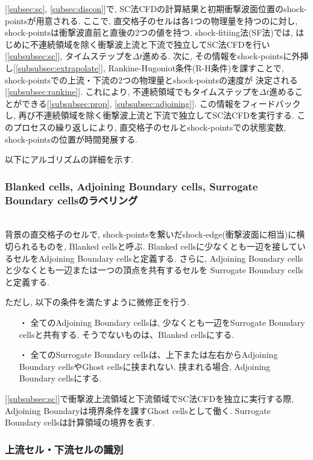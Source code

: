 \documentclass[a4j]{jarticle}
\begin{document}
[\ref{subsec:sc}, \ref{subsec:discon}]で, SC法CFDの計算結果と初期衝撃波面位置のshock-pointsが用意される.
ここで, 直交格子のセルは各1つの物理量を持つのに対し, shock-pointsは衝撃波直前と直後の2つの値を持つ.
shock-fitiing法(SF法)では, はじめに不連続領域を除く衝撃波上流と下流で独立してSC法CFDを行い[\ref{subsubsec:sc}], タイムステップを$\Delta t$進める.
次に, その情報をshock-pointsに外挿し[\ref{subsubsec:extrapolate}], Rankine-Hugoniot条件(R-H条件)を課すことで, shock-pointsでの上流・下流の2つの物理量とshock-pointsの速度が
決定される[\ref{subsubsec:rankine}]. これにより, 不連続領域でもタイムステップを$\Delta t$進めることができる[\ref{subsubsec:prop}, \ref{subsubsec:adjoining}]. この情報をフィードバックし, 再び不連続領域を除く衝撃波上流と下流で独立してSC法CFDを実行する.
このプロセスの繰り返しにより, 直交格子のセルとshock-pointsでの状態変数, shock-pointsの位置が時間発展する. 

以下にアルゴリズムの詳細を示す.

\subsubsection{Blanked cells, Adjoining Boundary cells, Surrogate Boundary cellsのラベリング} \label{subsubsec:boundary}
\mbox{}\\[1.0ex]
背景の直交格子のセルで, shock-pointsを繋いだshock-edge(衝撃波面に相当)に横切られるものを,
Blanked cellsと呼ぶ. 
Blanked cellsに少なくとも一辺を接しているセルをAdjoining Boundary cellsと定義する.
さらに, Adjoining Boundary cellsと少なくとも一辺または一つの頂点を共有するセルを
Surrogate Boundary cellsと定義する.

ただし, 以下の条件を満たすように微修正を行う.
\begin{itemize}
  \item[・]  全てのAdjoining Boundary cellsは, 少なくとも一辺をSurrogate Boundary cellsと共有する.
  そうでないものは、Blanked cellsにする.
  \item[・]  全てのSurrogate Boundary cellsは、上下または左右からAdjoining Boundary cellsやGhost cellsに挟まれない.
  挟まれる場合, Adjoining Boundary cellsにする.
\end{itemize}

[\ref{subsubsec:sc}]で衝撃波上流領域と下流領域でSC法CFDを独立に実行する際, Adjoining Boundaryは境界条件を課すGhost cellsとして働く.
Surrogate Boundary cellsは計算領域の境界を表す.

\subsubsection{上流セル・下流セルの識別} \label{subsubsec:udflow}
\mbox{}\\[-1.0ex]
\end{document}
